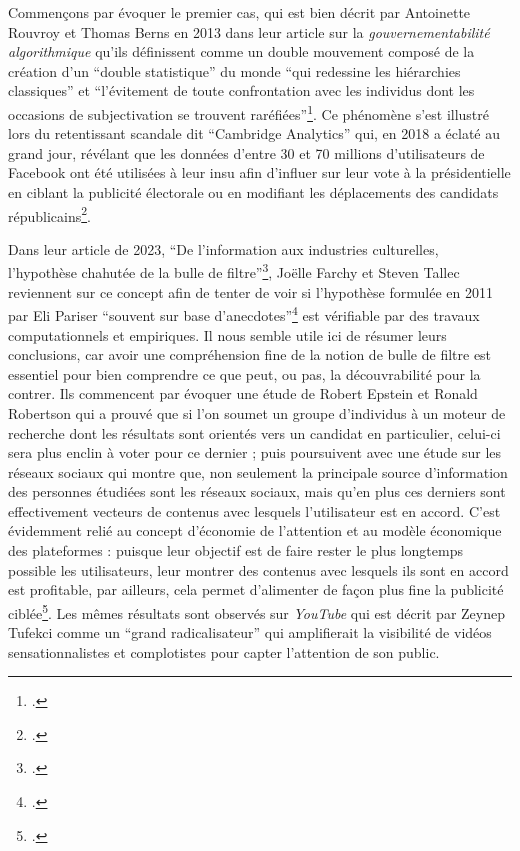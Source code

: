 Commençons par évoquer le premier cas, qui est bien décrit par Antoinette Rouvroy et Thomas Berns en 2013 dans leur article sur la \textit{gouvernementabilité algorithmique} qu’ils définissent comme un double mouvement composé de la création d’un \enquote{double statistique} du monde \enquote{qui redessine les hiérarchies classiques} et \enquote{l’évitement de toute confrontation avec les individus dont les occasions de subjectivation se trouvent raréfiées}\footcite{rouvroy_gouvernementalite_2013}. Ce phénomène s’est illustré lors du retentissant scandale dit \enquote{Cambridge Analytics} qui, en 2018 a éclaté au grand jour, révélant que les données d’entre 30 et 70 millions d’utilisateurs de Facebook ont été utilisées à leur insu afin d’influer sur leur vote à la présidentielle en ciblant la publicité électorale ou en modifiant les déplacements des candidats républicains\footcite{noauthor_ce_2018}.

Dans leur article de 2023, \enquote{De l’information aux industries culturelles, l’hypothèse chahutée de la bulle de filtre}\footcite{farchy_linformation_2023}, Joëlle Farchy et Steven Tallec reviennent sur ce concept afin de tenter de voir si l’hypothèse formulée en 2011 par Eli Pariser \enquote{souvent sur base d’anecdotes}\footcite[§ 5]{farchy_linformation_2023} est vérifiable par des travaux computationnels et empiriques. Il nous semble utile ici de résumer leurs conclusions, car avoir une compréhension fine de la notion de bulle de filtre est essentiel pour bien comprendre ce que peut, ou pas, la découvrabilité pour la contrer. Ils commencent par évoquer une étude de Robert Epstein et Ronald Robertson qui a prouvé que si l’on soumet un groupe d’individus à un moteur de recherche dont les résultats sont orientés vers un candidat en particulier, celui-ci sera plus enclin à voter pour ce dernier ; puis poursuivent avec une étude sur les réseaux sociaux qui montre que, non seulement la principale source d’information des personnes étudiées sont les réseaux sociaux, mais qu’en plus ces derniers sont effectivement vecteurs de contenus avec lesquels l’utilisateur est en accord. C’est évidemment relié au concept d’économie de l’attention et au modèle économique des plateformes : puisque leur objectif est de faire rester le plus longtemps possible les utilisateurs, leur montrer des contenus avec lesquels ils sont en accord est profitable, par ailleurs, cela permet d’alimenter de façon plus fine la publicité ciblée\footcite{noauthor_bulles_nodate}. Les mêmes résultats sont observés sur \textit{YouTube} qui est décrit par Zeynep Tufekci comme un \enquote{grand radicalisateur} qui amplifierait la visibilité de vidéos sensationnalistes et complotistes pour capter l’attention de son public.

